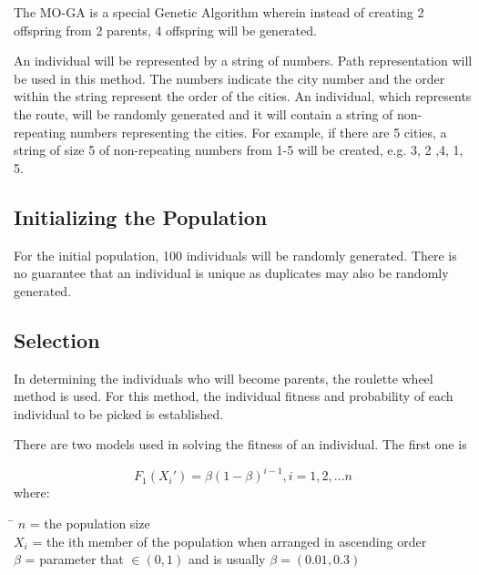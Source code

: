 The {MO-GA} is a special Genetic Algorithm wherein instead of creating 2 offspring from 2 parents, 4 offspring will be generated. \par

An individual will be represented by a string of numbers. Path representation will be used in this method. The numbers indicate the city number and the order within the string represent the order of the cities. An individual, which represents the route, will be randomly generated and it will contain a string of non-repeating numbers representing the cities. For example, if there are 5 cities, a string of size 5 of non-repeating numbers from 1-5 will be created, e.g. 3, 2 ,4, 1, 5. \par


\subsection{Initializing the Population}
\indent \indent For the initial population, 100 individuals will be randomly generated. There is no guarantee that an individual is unique as duplicates may also be randomly generated.\par 
\hfill \par

\subsection{Selection}
\indent \indent In determining the individuals who will become parents, the roulette wheel method is used. For this method, the individual fitness and probability of each individual to be picked is established. \par 

There are two models used in solving the fitness of an individual. The first one is \par 
\begin{equation}
	\label{eq:fit1}
	F_1(X_i')= \beta (1 - \beta )^{i-1}   , i= 1, 2, ... n
\end{equation}
where:
\begin{tabbing}
	\= \kill
	$n$\> = the population size\\
	$X_i$\> = the ith member of the population when arranged in ascending order\\
	$\beta$ \> =  parameter that $\in(0,1)$ and is usually $\beta=(0.01, 0.3)$\cite{realnumbergenetic}\\
\end{tabbing}

